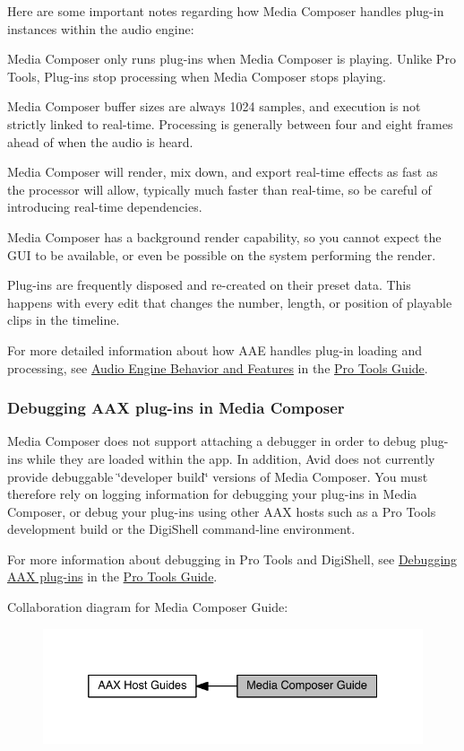 Here are some important notes regarding how Media Composer handles plug-\/in instances within the audio engine\+: 
\begin{DoxyItemize}
\item Media Composer only runs plug-\/ins when Media Composer is playing. Unlike Pro Tools, Plug-\/ins stop processing when Media Composer stops playing.  
\item Media Composer buffer sizes are always 1024 samples, and execution is not strictly linked to real-\/time. Processing is generally between four and eight frames ahead of when the audio is heard.  
\item Media Composer will render, mix down, and export real-\/time effects as fast as the processor will allow, typically much faster than real-\/time, so be careful of introducing real-\/time dependencies.  
\item Media Composer has a background render capability, so you cannot expect the G\+U\+I to be available, or even be possible on the system performing the render.  
\item Plug-\/ins are frequently disposed and re-\/created on their preset data. This happens with every edit that changes the number, length, or position of playable clips in the timeline.  
\end{DoxyItemize}

For more detailed information about how A\+A\+E handles plug-\/in loading and processing, see \hyperlink{a00360_aax_pro_tools_guide_03_audio_engine_behavior}{Audio Engine Behavior and Features} in the \hyperlink{a00360}{Pro Tools Guide}.

\hypertarget{a00361_subsection__aax_media_composer_guide__debugging}{}\subsubsection{Debugging A\+A\+X plug-\/ins in Media Composer}\label{a00361_subsection__aax_media_composer_guide__debugging}
 Media Composer does not support attaching a debugger in order to debug plug-\/ins while they are loaded within the app. In addition, Avid does not currently provide debuggable \char`\"{}developer build\char`\"{} versions of Media Composer. You must therefore rely on logging information for debugging your plug-\/ins in Media Composer, or debug your plug-\/ins using other A\+A\+X hosts such as a Pro Tools development build or the Digi\+Shell command-\/line environment.

For more information about debugging in Pro Tools and Digi\+Shell, see \hyperlink{a00360_aax_pro_tools_guide_06_debugging_aax_plugins}{Debugging A\+A\+X plug-\/ins} in the \hyperlink{a00360}{Pro Tools Guide}.

 Collaboration diagram for Media Composer Guide\+:
\nopagebreak
\begin{figure}[H]
\begin{center}
\leavevmode
\includegraphics[width=332pt]{a00361}
\end{center}
\end{figure}
